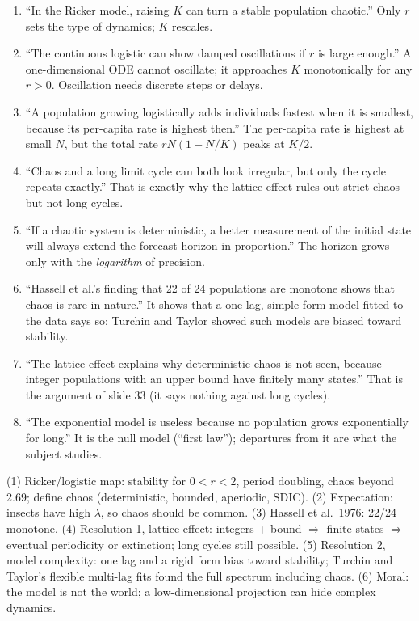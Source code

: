 \begin{statements}
\begin{enumerate}[label=\arabic*.]
\item ``In the Ricker model, raising $K$ can turn a stable population chaotic.''
\F Only $r$ sets the type of dynamics; $K$ rescales.
\item ``The continuous logistic can show damped oscillations if $r$ is large enough.''
\F A one-dimensional ODE cannot oscillate; it approaches $K$ monotonically for any $r>0$. Oscillation needs discrete
steps or delays.
\item ``A population growing logistically adds individuals fastest when it is smallest, because its per-capita rate is highest then.''
\F The per-capita rate is highest at small $N$, but the total rate $rN(1-N/K)$ peaks at $K/2$.
\item ``Chaos and a long limit cycle can both look irregular, but only the cycle repeats exactly.''
\T That is exactly why the lattice effect rules out strict chaos but not long cycles.
\item ``If a chaotic system is deterministic, a better measurement of the initial state will always extend the forecast horizon in proportion.''
\F The horizon grows only with the \emph{logarithm} of precision.
\item ``Hassell et al.'s finding that 22 of 24 populations are monotone shows that chaos is rare in nature.''
\F It shows that a one-lag, simple-form model fitted to the data says so; Turchin and Taylor showed such models are biased toward stability.
\item ``The lattice effect explains why deterministic chaos is not seen, because integer populations with an upper bound have finitely many states.''
\T That is the argument of slide 33 (it says nothing against long cycles).
\item ``The exponential model is useless because no population grows exponentially for long.''
\F It is the null model (``first law''); departures from it are what the subject studies.
\end{enumerate}
\end{statements}

\begin{longans}
(1) Ricker/logistic map: stability for $0<r<2$, period doubling, chaos beyond 2.69; define chaos (deterministic,
bounded, aperiodic, SDIC). (2) Expectation: insects have high $\lambda$, so chaos should be common. (3) Hassell et al.\
1976: 22/24 monotone. (4) Resolution 1, lattice effect: integers + bound $\Rightarrow$ finite states $\Rightarrow$
eventual periodicity or extinction; long cycles still possible. (5) Resolution 2, model complexity: one lag and a
rigid form bias toward stability; Turchin and Taylor's flexible multi-lag fits found the full spectrum including
chaos. (6) Moral: the model is not the world; a low-dimensional projection can hide complex dynamics.
\end{longans}
